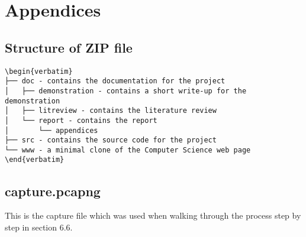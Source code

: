 \section{Appendices}
\subsection{Structure of ZIP file}


\begin{lstlisting}[language=none,style=tree,firstline=2,lastline=8]
\begin{verbatim}
├── doc - contains the documentation for the project
│   ├── demonstration - contains a short write-up for the demonstration
│   ├── litreview - contains the literature review
│   └── report - contains the report
│       └── appendices
├── src - contains the source code for the project
└── www - a minimal clone of the Computer Science web page
\end{verbatim}
\end{lstlisting}

\subsection{capture.pcapng}
This is the capture file which was used when walking through the process step by step in section 6.6.

\newpage
